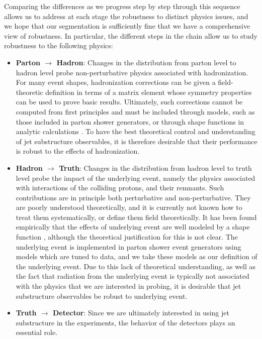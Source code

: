 \documentclass[11pt,letterpaper]{article}
\begin{document}
Comparing the differences as we progress step by step through this sequence allows us to address at each stage the robustness to distinct physics issues, and we hope that our segmentation is sufficiently fine that we have a comprehensive view of robustness.
%
In particular, the different steps in the chain allow us to study robustness to the following physics: 
%
\begin{itemize}
%
\item {\bf Parton $\to$ Hadron}: Changes in the distribution from parton
  level to hadron level probe non-perturbative physics associated with
  hadronization.
  For many event shapes, hadronization corrections can
  be given a field-theoretic definition in terms of a matrix element
  whose symmetry properties can be used to prove basic
  results.
  Ultimately, such corrections cannot be computed
  from first principles and must be included through models, such as
  those included in parton shower generators, or through shape
  functions in analytic calculations
  \cite{Dokshitzer:1995qm,Dokshitzer:1995zt,Korchemsky:1999kt,Korchemsky:2000kp,Bosch:2004th,Hoang:2007vb,Ligeti:2008ac}.
    To have the best theoretical
  control and understanding of jet substructure observables, it is
  therefore desirable that their performance is robust to the effects
  of hadronization.
\item {\bf Hadron $\to$ Truth}: Changes in the distribution from hadron level to truth level probe the impact of the underlying event, namely the physics associated with interactions of the colliding protons, and their remnants.
%
Such contributions are in principle both perturbative and non-perturbative.
%
They are poorly understood theoretically, and it is currently not known how to treat them systematically, or define them field theoretically.
%
It has been found empirically that the effects of underlying event are well modeled by a shape function \cite{Stewart:2014nna}, although the theoretical justification for this is not clear.
%
The underlying event is implemented in parton shower event generators using models which are tuned to data, and we take these models as our definition of the underlying event.
%
Due to this lack of theoretical understanding, as well as the fact that radiation from the underlying event is typically not associated with the physics that we are interested in probing, it is desirable that jet substructure observables be robust to underlying event.
%
\item {\bf Truth $\to$ Detector}: Since we are ultimately interested in using jet substructure in the experiments, the behavior of the detectors plays an essential role.

\end{itemize}
\end{document}

